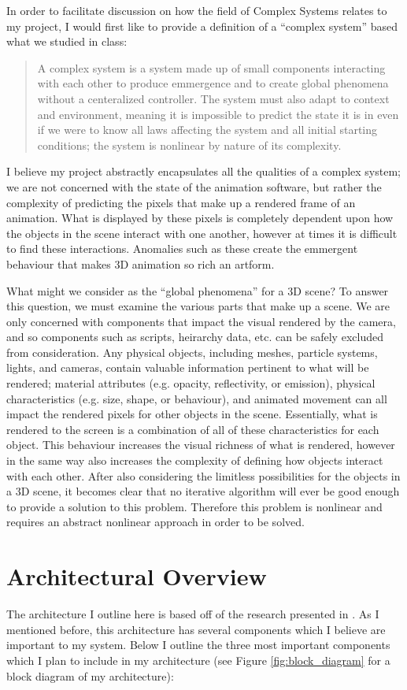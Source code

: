 \documentclass[conference]{IEEEtran}
\begin{document}
In order to facilitate discussion on how the field of Complex Systems relates to
my project, I would first like to provide a definition of a ``complex system''
based what we studied in class:

\blockquote{
A complex system is a system made up of small components interacting with each
other to produce emmergence and to create global phenomena without a centeralized
controller. The system must also adapt to context and environment, meaning it is
impossible to predict the state it is in even if we were to know all laws
affecting the system and all initial starting conditions; the system is
nonlinear by nature of its complexity.
}

I believe my project abstractly encapsulates all the qualities of a complex system;
we are not concerned with the state of the animation software, but rather the
complexity of predicting the pixels that make up a rendered frame of an
animation. What is displayed by these pixels is completely dependent upon how
the objects in the scene interact with one another, however at times it is difficult
to find these interactions.
Anomalies such as these create the emmergent behaviour that makes 3D animation so rich
an artform.

What might we consider as the ``global phenomena'' for a 3D scene?
To answer this question, we must examine the various parts that make up a scene.
We are only concerned with components that impact the visual rendered by the
camera, and so components such as scripts, heirarchy data, etc. can be safely
excluded from consideration. Any physical objects, including meshes, particle
systems, lights, and cameras, contain valuable information pertinent to
what will be rendered; material attributes (e.g. opacity, reflectivity, or emission),
physical characteristics (e.g. size, shape, or behaviour), and animated movement can all
impact the rendered pixels for other objects in the scene. Essentially, what is rendered to the
screen is a combination of all of these characteristics for each object.
This behaviour increases the visual richness of what is rendered, however in the
same way also increases the complexity of defining how objects interact with
each other. After also considering the limitless possibilities for the objects
in a 3D scene,
it becomes clear that no iterative algorithm will ever be good enough
to provide a solution to this problem. Therefore this problem is
nonlinear and requires an abstract nonlinear approach in order to be solved.

\section{Architectural Overview}
\label{sec:architecture}
The architecture I outline here is based off of the research presented in
\cite{ref:pose_guided}. As I mentioned before, this architecture has several
components which I believe are important to my system. Below I outline the three
most important components which I plan to include in my architecture (see Figure
\ref{fig:block_diagram} for a block diagram of my architecture):
\end{document}
